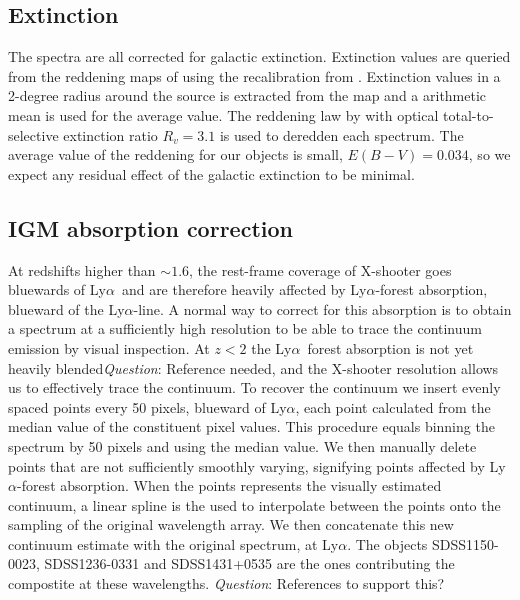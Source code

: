 \documentclass{aa}    %
\newcommand{\sectlabel}[1]{\label{sect:#1}}
\newcommand{\lya}{Ly$\alpha$}
\newcommand{\todo}[3]{{\color{#2}\emph{#1}: #3}}
\newcommand{\qtodo}[1]{\todo{Question}{red}{#1}}
\begin{document}
\subsection{Extinction} \sectlabel{extinct}

The spectra are all corrected for galactic extinction. Extinction values are queried from the reddening maps of \citet{Schlegel1998} using the recalibration from \citet{Schlafly2011}. Extinction values in a 2-degree radius around the source is extracted from the map and a arithmetic mean is used for the average value. The reddening law by \citet{Fitzpatrick1999} with optical total-to-selective extinction ratio $R_v = 3.1$ is used to deredden each spectrum. The average value of the reddening for our objects is small, $E(B-V) = 0.034$, so we expect any residual effect of the galactic extinction to be minimal. 


\subsection{IGM absorption correction} \sectlabel{igm}

At redshifts higher than $\sim1.6$, the rest-frame coverage of X-shooter goes bluewards of \lya~and are therefore heavily affected by \lya-forest absorption, blueward of the \lya-line. A normal way to correct for this absorption is to obtain a spectrum at a sufficiently high resolution to be able to trace the continuum emission by visual inspection. At $z < 2 $ the \lya~forest absorption is not yet heavily blended\qtodo{Reference needed}, and the X-shooter resolution allows us to effectively trace the continuum. To recover the continuum we insert evenly spaced points every 50 pixels, blueward of \lya, each point calculated from the median value of the constituent pixel values. This procedure equals binning the spectrum by 50 pixels and using the median value. We then manually delete points that are not sufficiently smoothly varying, signifying points affected by \lya-forest absorption. When the points represents the visually estimated continuum, a linear spline is the used to interpolate between the points onto the sampling of the original wavelength array. We then concatenate this new continuum estimate with the original spectrum, at \lya. The objects SDSS1150-0023, SDSS1236-0331 and SDSS1431+0535 are the ones contributing the compostite at these wavelengths. \qtodo{References to support this?}
\end{document}
